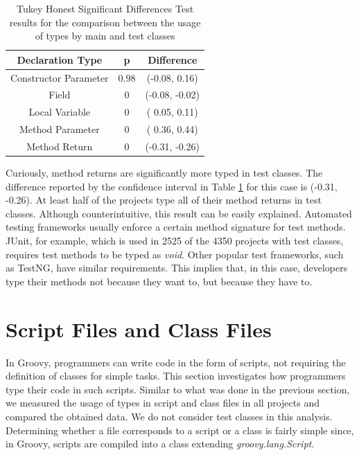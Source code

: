 \documentclass[msc]{ppgccufmg}
\begin{document}
\FloatBarrier




\begin{table}[h!]
\centering{}%

\caption{Tukey Honest Significant Differences Test results for the comparison between the usage of types by main and test classes}
\begin{tabular}{|c|c|c|}
\hline 
Declaration Type    & p & Difference \\
\hline 
\hline 
Constructor Parameter &  0.98     & (-0.08,  0.16) \\ \hline
Field &  0          & (-0.08, -0.02)  \\ \hline
Local Variable &  0          & ( 0.05,  0.11) \\ \hline
Method Parameter &  0          & ( 0.36,  0.44) \\ \hline
Method Return &  0          & (-0.31, -0.26) \\ \hline
\end{tabular}
\label{tab:test_utest_type}
\end{table}




Curiously, method returns are significantly more typed in test classes.
The difference reported by the confidence interval in Table \ref{tab:test_utest_type} for this case is (-0.31, -0.26).
At least half of the projects type all of their method returns in test classes.
Although counterintuitive, this result can be easily explained.
Automated testing frameworks usually enforce a certain method signature for test methods.
JUnit, for example, which is used in 2525 of the 4350 projects with test classes, requires test methods to be typed as \emph{void}.
Other popular test frameworks, such as TestNG, have similar requirements.
This implies that, in this case, developers type their methods not because they want to, but because they have to.





\section{Script Files and Class Files\label{sec:results-scripts}}
In Groovy, programmers can write code in the form of scripts, not requiring the definition of classes for simple tasks.
This section investigates how programmers type their code in such scripts.
Similar to what was done in the previous section, we measured the usage of types in script and class files in all projects and compared the obtained data.
We do not consider test classes in this analysis.
Determining whether a file corresponds to a script or a class is fairly simple since, in Groovy, scripts are compiled into a class extending \emph{groovy.lang.Script}.
\end{document}
